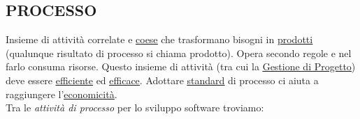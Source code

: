 		\subsection{PROCESSO}  \label{processo}
		Insieme di attività correlate e \underline{\hyperref[coeso]{coese}} che trasformano bisogni in \underline{\hyperref[prodotto]{prodotti}} (qualunque risultato di processo si chiama prodotto).
		Opera secondo regole e nel farlo consuma risorse.
		Questo insieme di attività (tra cui la \underline{\hyperref[gestioneprogetto]{Gestione di Progetto}}) deve essere \underline{\hyperref[efficienza]{efficiente}} ed \underline{\hyperref[efficacia]{efficace}}.
		Adottare \underline{\hyperref[standard]{standard}} di processo ci aiuta a raggiungere l'\underline{\hyperref[economicita]{economicità}}.\\
		Tra le \textit{attività di processo} per lo sviluppo software troviamo:
